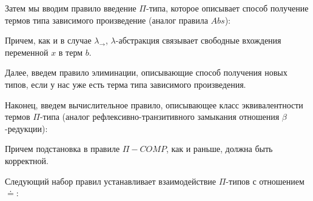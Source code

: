 \documentclass{article}[12pt]
\begin{document}
Затем мы вводим правило введение $\Pi$-типа, которое описывает способ получение термов типа зависимого
произведение (аналог правила $Abs$):
\begin{prooftree}
\end{prooftree}
Причем, как и в случае $\lambda_\rightarrow$, $\lambda$-абстракция связывает свободные вхождения переменной
$x$ в терм  $b$.

Далее, введем правило элиминации, описывающие способ получения новых типов, если у нас уже есть терма
типа зависимого произведения.
\begin{prooftree}
\end{prooftree}

Наконец, введем вычислительное правило, описывающее класс эквивалентности термов $\Pi$-типа (аналог 
рефлексивно-транзитивного замыкания отношения $\beta$-редукции):
\begin{prooftree}
\end{prooftree}
Причем подстановка в правиле $\Pi-COMP$, как и раньше, должна быть корректной.

Следующий набор правил устанавливает взаимодействие $\Pi$-типов с отношением $\doteq$:
\begin{prooftree}
\end{prooftree}
\begin{prooftree}
\end{prooftree}
\begin{prooftree}
\end{prooftree}
\end{document}
